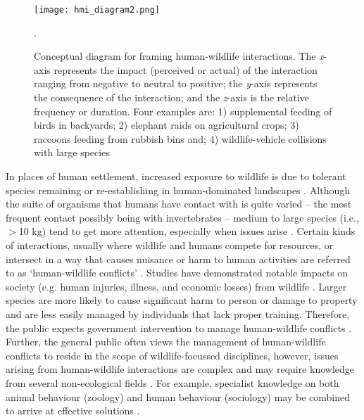 \begin{figure*}[!t]
  \centering
  \texttt{[image: hmi\_diagram2.png]}
  \caption[Conceptual diagram for framing human-wildlife interactions]{Conceptual diagram for framing human-wildlife interactions. The \textit{x}-axis represents the impact (perceived or actual) of the interaction ranging from negative to neutral to positive; the \textit{y}-axis represents the consequence of the interaction; and the \textit{z}-axis is the relative frequency or duration. Four examples are: 1) supplemental feeding of birds in backyards; 2) elephant raids on agricultural crops; 3) raccoons feeding from rubbish bins and; 4) wildlife-vehicle collisions with large species}.
  \label{hmi_diagram}
\end{figure*}

In places of human settlement, increased exposure to wildlife is due to tolerant species remaining or re-establishing in human-dominated landscapes \citep{soul16}. Although the suite of organisms that humans have contact with is quite varied -- the most frequent contact possibly being with invertebrates -- medium to large species (i.e., $>$10 kg) tend to get more attention, especially when issues arise \citep{seor16}. Certain kinds of interactions, usually where wildlife and humans compete for resources, or intersect in a way that causes nuisance or harm to human activities are referred to as `human-wildlife conflicts' \citep[but see][]{pete10}. Studies have demonstrated notable impacts on society (e.g. human injuries, illness, and economic losses) from wildlife \citep{cono95}. Larger species are more likely to cause significant harm to person or damage to property \citep{cono01} and are less easily managed by individuals that lack proper training. Therefore, the public expects government intervention to manage human-wildlife conflicts \citep{reit99}. Further, the general public often views the management of human-wildlife conflicts to reside in the scope of wildlife-focussed disciplines, however, issues arising from human-wildlife interactions are complex and may require knowledge from several non-ecological fields \citep{deck97,madd04}. For example, specialist knowledge on both animal behaviour (zoology) and human behaviour (sociology) may be combined to arrive at effective solutions \citep{dicka10}.


